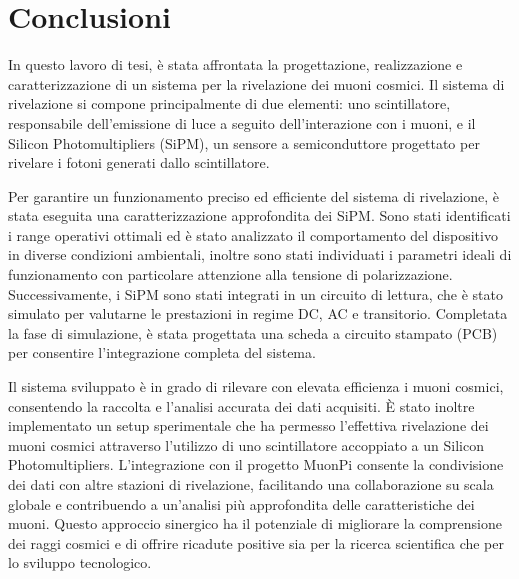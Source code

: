 \chapter*{Conclusioni}
In questo lavoro di tesi, è stata affrontata la progettazione, realizzazione e caratterizzazione di un sistema per la rivelazione dei muoni cosmici. Il sistema 
di rivelazione si compone principalmente di due elementi: uno scintillatore, responsabile dell'emissione di luce a seguito dell'interazione 
con i muoni, e il Silicon Photomultipliers (SiPM), un sensore a semiconduttore progettato per rivelare i fotoni generati dallo scintillatore.

Per garantire un funzionamento preciso ed efficiente del sistema di rivelazione, è stata eseguita una caratterizzazione approfondita dei 
SiPM. Sono stati identificati i range operativi ottimali ed è stato analizzato il comportamento del dispositivo in diverse condizioni 
ambientali, inoltre sono stati individuati i parametri ideali di funzionamento con particolare attenzione alla tensione di polarizzazione. 
Successivamente, i SiPM sono stati integrati in un circuito di lettura, che è stato simulato per valutarne le prestazioni in regime DC, AC e
transitorio. Completata la fase di simulazione, è stata progettata una scheda a circuito stampato (PCB) per consentire l'integrazione 
completa del sistema.

Il sistema sviluppato è in grado di rilevare con elevata efficienza i muoni cosmici, consentendo la raccolta e l’analisi accurata dei dati 
acquisiti. È stato inoltre implementato un setup sperimentale che ha permesso l’effettiva rivelazione dei muoni cosmici attraverso 
l’utilizzo di uno scintillatore accoppiato a un Silicon Photomultipliers. L'integrazione con il progetto MuonPi consente la condivisione 
dei dati con altre stazioni di rivelazione, facilitando una collaborazione su scala globale e contribuendo a un’analisi più approfondita 
delle caratteristiche dei muoni. Questo approccio sinergico ha il potenziale di migliorare la comprensione dei raggi cosmici e di offrire 
ricadute positive sia per la ricerca scientifica che per lo sviluppo tecnologico.